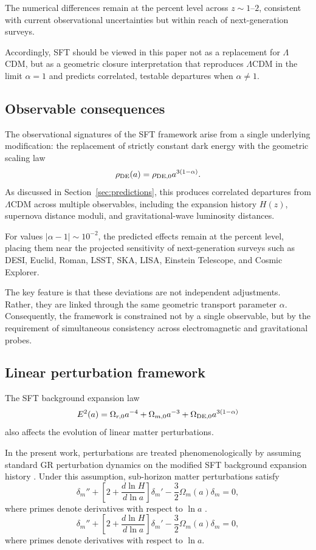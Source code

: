 \documentclass[12pt]{article}
\begin{document}
The numerical differences remain at the percent level across $z\sim1$--$2$,
consistent with current observational uncertainties but within reach of
next-generation surveys. 


Accordingly, SFT should be viewed in this paper not as a replacement for
$\Lambda$CDM, but as a geometric closure interpretation that reproduces
$\Lambda$CDM in the limit $\alpha=1$ and predicts correlated, testable
departures when $\alpha\neq1$.

\subsection{Observable consequences}

The observational signatures of the SFT framework arise from a single
underlying modification: the replacement of strictly constant dark energy
with the geometric scaling law
\[
\rho_{\rm DE}(a)
=
\rho_{{\rm DE},0}a^{3(1-\alpha)}.
\]
As discussed in Section~\ref{sec:predictions}, this produces correlated
departures from $\Lambda$CDM across multiple observables, including the
expansion history $H(z)$, supernova distance moduli, and gravitational-wave
luminosity distances.

For values $|\alpha-1|\sim10^{-2}$, the predicted effects remain at the
percent level, placing them near the projected sensitivity of next-generation
surveys such as DESI, Euclid, Roman, LSST, SKA, LISA, Einstein Telescope,
and Cosmic Explorer.

The key feature is that these deviations are not independent adjustments.
Rather, they are linked through the same geometric transport parameter
$\alpha$. Consequently, the framework is constrained not by a single
observable, but by the requirement of simultaneous consistency across
electromagnetic and gravitational probes.


\subsection{Linear perturbation framework}

The SFT background expansion law
\[
E^2(a)=
\Omega_{r,0}a^{-4}
+\Omega_{m,0}a^{-3}
+\Omega_{\rm DE,0}a^{3(1-\alpha)}
\]
also affects the evolution of linear matter perturbations.

In the present work, perturbations are treated phenomenologically by
assuming standard GR perturbation dynamics on the modified SFT
background expansion history \cite{Mukhanov2005,Dodelson2003,MaBertschinger1995}. Under this assumption, sub-horizon matter
perturbations satisfy
\[
\delta_m''+
\left[
2+\frac{d\ln H}{d\ln a}
\right]\delta_m'
-
\frac{3}{2}\Omega_m(a)\delta_m=0,
\]
where primes denote derivatives with respect to \(\ln a\)
\cite{Linder2005,Dodelson2003}.
\[
\delta_m''+
\left[
2+\frac{d\ln H}{d\ln a}
\right]\delta_m'
-
\frac{3}{2}\Omega_m(a)\delta_m=0,
\]
where primes denote derivatives with respect to \(\ln a\).
\end{document}

